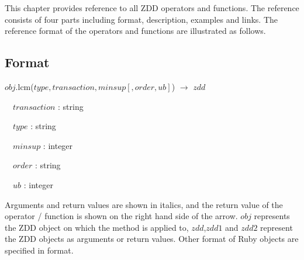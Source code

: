 
This chapter provides reference to all ZDD operators and functions. The reference consists of four parts including format, description, examples and links.  The reference format of the operators and functions are illustrated as follows.

\begin{center}
\begin{minipage}{0.8\hsize}
\subsection*{Format}
$obj$.lcm($type,transaction,minsup[,order,ub]$) $\rightarrow$ $zdd$

~~$transaction$ : string

~~$type$ : string

~~$minsup$ : integer

~~$order$ : string

~~$ub$ : integer
\end{minipage}
\end{center}


Arguments and return values are shown in italics, and the return value of the operator / function is shown on the right hand side of the arrow. $obj$ represents the ZDD object on which the method is applied to,  $zdd$,$zdd1$ and $zdd2$ represent the ZDD objects as arguments or return values. Other format of Ruby objects are specified in format.

